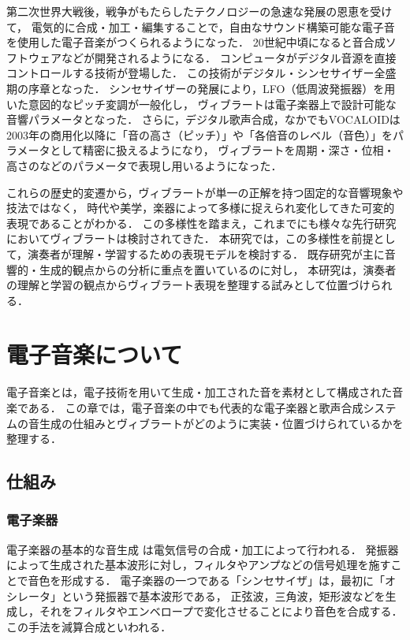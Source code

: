 第二次世界大戦後，戦争がもたらしたテクノロジーの急速な発展の恩恵を受けて，
電気的に合成・加工・編集することで，自由なサウンド構築可能な電子音を使用した電子音楽がつくられるようになった．
20世紀中頃になると音合成ソフトウェアなどが開発されるようになる．
コンピュータがデジタル音源を直接コントロールする技術が登場した．
この技術がデジタル・シンセサイザー全盛期の序章となった．
シンセサイザーの発展により，LFO（低周波発振器）を用いた意図的なピッチ変調が一般化し，
ヴィブラートは電子楽器上で設計可能な音響パラメータとなった．
さらに，デジタル歌声合成，なかでもVOCALOID\cite{Vocaloid}は2003年の商用化以降に「音の高さ（ピッチ）」や「各倍音のレベル（音色）」をパラメータとして精密に扱えるようになり，
ヴィブラートを周期・深さ・位相・高さのなどのパラメータで表現し用いるようになった．

これらの歴史的変遷から，ヴィブラートが単一の正解を持つ固定的な音響現象や技法ではなく，
時代や美学，楽器によって多様に捉えられ変化してきた可変的表現であることがわかる．
この多様性を踏まえ，これまでにも様々な先行研究においてヴィブラートは検討されてきた．
本研究では，この多様性を前提として，演奏者が理解・学習するための表現モデルを検討する．
既存研究が主に音響的・生成的観点からの分析に重点を置いているのに対し，
本研究は，演奏者の理解と学習の観点からヴィブラート表現を整理する試みとして位置づけられる．

\section{電子音楽について}
電子音楽とは，電子技術を用いて生成・加工された音を素材として構成された音楽である．
この章では，電子音楽の中でも代表的な電子楽器と歌声合成システムの音生成の仕組みとヴィブラートがどのように実装・位置づけられているかを整理する．


\subsection{仕組み}

\subsubsection{電子楽器}

電子楽器の基本的な音生成\cite{Kamogawa13}
\cite{Shimizu08}は電気信号の合成・加工によって行われる．
発振器によって生成された基本波形に対し，フィルタやアンプなどの信号処理を施すことで音色を形成する．
電子楽器の一つである「シンセサイザ」は，最初に「オシレータ」という発振器で基本波形である，
正弦波，三角波，矩形波などを生成し，それをフィルタやエンベロープで変化させることにより音色を合成する．
この手法を減算合成といわれる．

